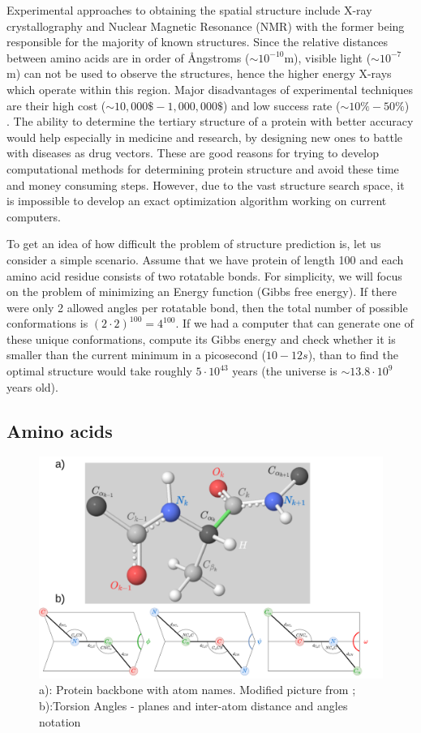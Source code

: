 Experimental approaches to obtaining the spatial structure include X-ray crystallography and Nuclear Magnetic Resonance (NMR) with the former being responsible for the majority of known structures. 
Since the relative distances between amino acids are in order of \AA ngstroms ($\sim10^{-10}$m), visible light ($\sim10^{-7}$m) can not be used to observe the structures, hence the higher energy X-rays which operate within this region. 
Major disadvantages of experimental techniques are their high cost ($\sim 10,000\mathdollar-1,000,000\mathdollar$) and low success rate ($\sim 10\%-50\%$) \cite{protcost}.
The ability to determine the tertiary structure of a protein with better accuracy would help especially in medicine and research, by designing new ones to battle with diseases as drug vectors.
These are good reasons for trying to develop computational methods for determining protein structure and avoid these time and money consuming steps.
However, due to the vast structure search space, it is impossible to develop an exact optimization algorithm working on current computers.

To get an idea of how difficult the problem of structure prediction is, let us consider a simple scenario. 
Assume that we have protein of length 100 and each amino acid residue consists of two rotatable bonds. 
For simplicity, we will focus on the problem of minimizing an Energy function (Gibbs free energy).
If there were only 2 allowed angles per rotatable bond, then the total number of possible conformations is $(2\cdot2)^{100} = 4^{100}$. 
If we had a computer that can generate one of these unique conformations, compute its Gibbs energy and check whether it is smaller than the current minimum in a picosecond ($10-{12} s$), than to find the optimal structure would take roughly $5 \cdot 10^{43}$ years (the universe is $\sim 13.8\cdot10^9$ years old).

\subsection{Amino acids}

\begin{figure}
    \centering
    \includegraphics[width=\linewidth]{imgs_tomas/torsion_2.png}
    \caption{a): Protein backbone with atom names. Modified picture from \cite{ramachandran}; b):Torsion Angles - planes and inter-atom distance and angles notation}
    \label{fig:backbone_torsion}
\end{figure}

